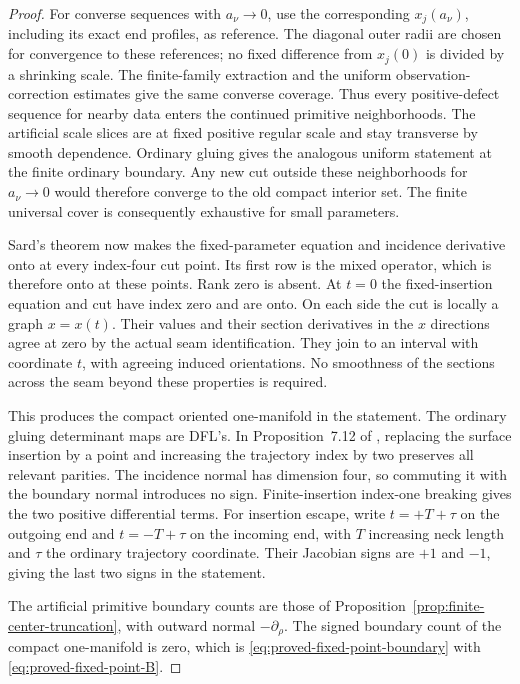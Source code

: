 \documentclass[11pt]{amsart}
\theoremstyle{definition}
\theoremstyle{remark}
\theoremstyle{plain}
\begin{document}
\begin{proof}
For converse sequences with
$a_\nu\to0$, use the corresponding
$x_j(a_\nu)$, including its exact
end profiles, as reference.
The diagonal outer radii are chosen
for convergence to these references;
no fixed difference from $x_j(0)$
is divided by a shrinking scale.
The finite-family extraction and
the uniform observation-correction
estimates give the same converse
coverage. Thus every positive-defect
sequence for nearby data enters
the continued primitive neighborhoods.
The artificial scale slices are
at fixed positive regular scale
and stay transverse by smooth
dependence. Ordinary gluing gives
the analogous uniform statement
at the finite ordinary boundary.
Any new cut outside these
neighborhoods for $a_\nu\to0$
would therefore converge to
the old compact interior set.
The finite universal cover is
consequently exhaustive for small
parameters.

Sard's theorem now makes the
fixed-parameter equation and
incidence derivative onto at
every index-four cut point.
Its first row is the mixed
operator, which is therefore
onto at these points.
Rank zero is absent.
At $t=0$ the fixed-insertion
equation and cut have index zero
and are onto. On each side the
cut is locally a graph $x=x(t)$.
Their values and their section
derivatives in the $x$ directions
agree at zero by the actual seam
identification. They join to an
interval with coordinate $t$,
with agreeing induced orientations.
No smoothness of the sections
across the seam beyond these
properties is required.

This produces the compact oriented
one-manifold in the statement.
The ordinary gluing determinant
maps are DFL's. In Proposition~7.12
of \cite{DaeFukLip21a}, replacing
the surface insertion by a point
and increasing the trajectory
index by two preserves all
relevant parities. The incidence
normal has dimension four, so
commuting it with the boundary
normal introduces no sign.
Finite-insertion index-one
breaking gives the two positive
differential terms.
For insertion escape, write
$t=+T+\tau$ on the outgoing
end and $t=-T+\tau$ on the
incoming end, with $T$ increasing
neck length and $\tau$ the
ordinary trajectory coordinate.
Their Jacobian signs are $+1$
and $-1$, giving the last two
signs in the statement.

The artificial primitive boundary
counts are those of
Proposition~\ref{prop:finite-center-truncation},
with outward normal $-\partial_\rho$.
The signed boundary count of the
compact one-manifold is zero,
which is
\eqref{eq:proved-fixed-point-boundary}
with \eqref{eq:proved-fixed-point-B}.
\end{proof}
\end{document}
